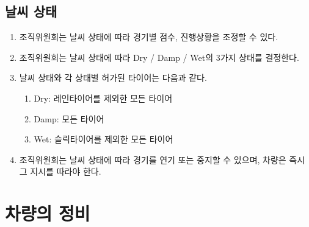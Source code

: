 \documentclass[final,a4paper,10pt]{report}
\begin{document}
{\section{날씨 상태}\label{rule:formula-competition.weather}
\begin{enumerate}
  \item\label{rule:formula-competition.weather.weather-based-adjustments} 조직위원회는 날씨 상태에 따라 경기별 점수, 진행상황을 조정할 수 있다.
  \item\label{rule:formula-competition.weather.dry-damp-wet-classification} 조직위원회는 날씨 상태에 따라 Dry / Damp / Wet의 3가지 상태를 결정한다.
  \item\label{rule:formula-competition.weather.allowed-tires-per-weather} 날씨 상태와 각 상태별 허가된 타이어는 다음과 같다.
    \begin{enumerate}
      \item\label{rule:formula-competition.weather.allowed-tires-per-weather.dry-excludes-rain-tires} Dry: 레인타이어를 제외한 모든 타이어
      \item\label{rule:formula-competition.weather.allowed-tires-per-weather.damp-all-tires-allowed} Damp: 모든 타이어
      \item\label{rule:formula-competition.weather.allowed-tires-per-weather.wet-excludes-slicks} Wet: 슬릭타이어를 제외한 모든 타이어
    \end{enumerate}
  \item\label{rule:formula-competition.weather.postpone-stop-and-compliance} 조직위원회는 날씨 상태에 따라 경기를 연기 또는 중지할 수 있으며, 차량은 즉시 그 지시를 따라야 한다.
\end{enumerate}

\chapter{차량의 정비}

}
\end{document}
